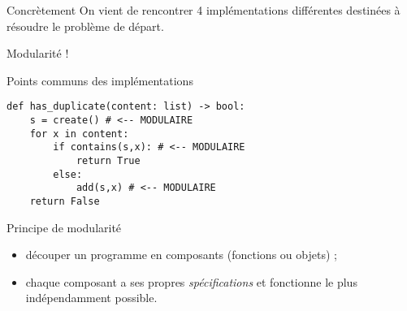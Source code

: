\documentclass[12pt]{nsibeamer}
\begin{document}
%

\begin{frame}{Concrètement}
\pause
On vient de rencontrer 4 implémentations différentes destinées à résoudre le problème de départ.
\end{frame}

\begin{frame}[standout]
	\begin{center}
		\Huge
		Modularité !
	\end{center}
\end{frame}

%

\begin{frame}[fragile]{Points communs des implémentations}

\begin{verbatim}
def has_duplicate(content: list) -> bool:
    s = create() # <-- MODULAIRE
    for x in content:
        if contains(s,x): # <-- MODULAIRE
            return True
        else:
            add(s,x) # <-- MODULAIRE
    return False
\end{verbatim}
\end{frame}

%

\begin{frame}[fragile]{Principe de modularité}
\pause
\begin{itemize}
	\item découper un programme en \alert{composants} (fonctions ou objets) ; \pause
	\item chaque composant a ses propres \textit{spécifications} et fonctionne le plus indépendamment possible.
\end{itemize}
\end{frame}
\end{document}
